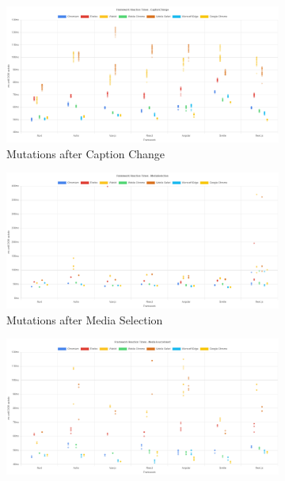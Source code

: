 \documentclass[a4paper, 10pt]{article}
\begin{document}
\begin{figure}[ht!]
  \centering
  \begin{subfigure}{0.9\linewidth}
    \begin{center}
      \includegraphics[width=\linewidth, keepaspectratio]{img/playwright-results/userActions_byUserAction/captionChange.png}
    \end{center}
    \caption{Mutations after Caption Change}\label{subfig:PW:captionChange}
  \end{subfigure}
  \begin{subfigure}{0.9\linewidth}
    \begin{center}
      \includegraphics[width=\linewidth, keepaspectratio]{img/playwright-results/userActions_byUserAction/mediaSelection.png}
    \end{center}
    \caption{Mutations after Media Selection}\label{subfig:PW:mediaSelection}
  \end{subfigure}
  \begin{subfigure}{0.9\linewidth}
    \begin{center}
      \includegraphics[width=\linewidth, keepaspectratio]{img/playwright-results/userActions_byUserAction/mediaSourceInsert.png}

\end{center}
\end{subfigure}
\end{figure}
\end{document}
